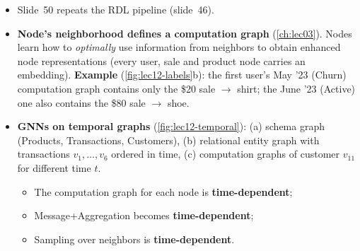 \begin{itemize}
  \item Slide~50 repeats the RDL pipeline (slide~46).
  \item \textbf{Node's neighborhood defines a computation graph} (\cref{ch:lec03}). Nodes
    learn how to \emph{optimally} use information from neighbors to obtain enhanced node
    representations (every user, sale and product node carries an embedding).
    \textbf{Example} (\cref{fig:lec12-labels}b): the first user's May '23 (Churn)
    computation graph contains only the \$20 sale $\to$ shirt; the June '23 (Active) one
    also contains the \$80 sale $\to$ shoe.
  \item \textbf{GNNs on temporal graphs} (\cref{fig:lec12-temporal}): (a) schema graph
    (Products, Transactions, Customers), (b) relational entity graph with transactions
    $v_1,\dots,v_6$ ordered in time, (c) computation graphs of customer $v_{11}$ for
    different time $t$.
    \begin{itemize}
      \item The computation graph for each node is \textbf{time-dependent};
      \item Message+Aggregation becomes \textbf{time-dependent};
      \item Sampling over neighbors is \textbf{time-dependent}.
    \end{itemize}
\end{itemize}

